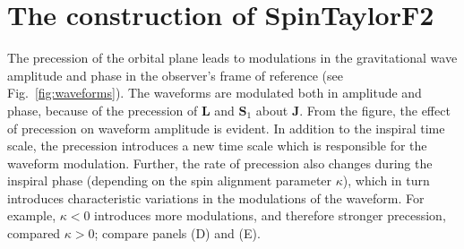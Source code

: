 \section{The construction of SpinTaylorF2}

The precession of the orbital plane leads to modulations in the gravitational
wave amplitude and phase in the observer's frame of reference (see
Fig.~\ref{fig:waveforms}). The waveforms are modulated both in amplitude and
phase, because of the precession of $\mathbf{L}$ and $\mathbf{S}_1$ about
$\mathbf{J}$. From the figure, the effect of precession on waveform amplitude
is evident. In addition to the inspiral time scale, the precession introduces
a new time scale which is responsible for the waveform modulation. Further,
the rate of precession also changes during the inspiral phase (depending on
the spin alignment parameter $\kappa$), which in turn introduces
characteristic variations in the modulations of the waveform. For example,
$\kappa < 0$ introduces more modulations, and therefore stronger precession,
compared $\kappa > 0$; compare panels (D) and (E).



